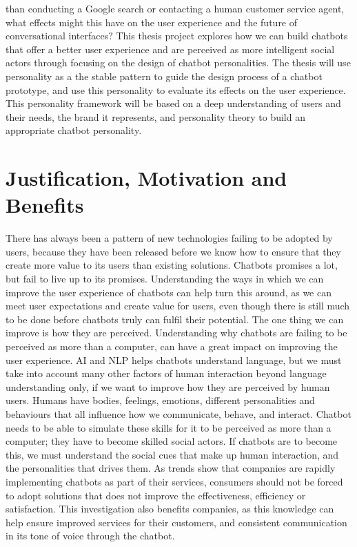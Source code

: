 than conducting a Google search or contacting a human customer service agent, what effects might this have on the user experience and the future of conversational interfaces?
This thesis project explores how we can build chatbots that offer a better user experience and are perceived as more intelligent social actors through focusing on the design of chatbot personalities. The thesis will use personality as a the stable pattern to guide the design process of a chatbot prototype, and use this personality to evaluate its effects on the user experience. This personality framework will be based on a deep understanding of users and their needs, the brand it represents, and personality theory to build an appropriate chatbot personality.

\vspace{5mm} %

\section{Justification, Motivation and Benefits}
There has always been a pattern of new technologies failing to be adopted by users, because they have been released before we know how to ensure that they create more value to its users than existing solutions. Chatbots promises a lot, but fail to live up to its promises. Understanding the ways in which we can improve the user experience of chatbots can help turn this around, as we can meet user expectations and create value for users, even though there is still much to be done before chatbots truly can fulfil their potential. The one thing we can improve is how they are perceived. Understanding why chatbots are failing to be perceived as more than a computer, can have a great impact on improving the user experience. AI and NLP helps chatbots understand language, but we must take into account many other factors of human interaction beyond language understanding only, if we want to improve how they are perceived by human users. Humans have bodies, feelings, emotions, different personalities and behaviours that all influence how we communicate, behave, and interact. Chatbot needs to be able to simulate these skills for it to be perceived as more than a computer; they have to become skilled social actors. If chatbots are to become this, we must understand the social cues that make up human interaction, and the personalities that drives them. As trends show that companies are rapidly implementing chatbots as part of their services, consumers should not be forced to adopt solutions that does not improve the effectiveness, efficiency or satisfaction. This investigation also benefits companies, as this knowledge can help ensure improved services for their customers, and consistent communication in its tone of voice through the chatbot.

